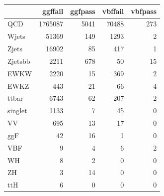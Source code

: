 \begin{tabular}{lrrrr}
\toprule
 & ggffail & ggfpass & vbffail & vbfpass \\
\midrule
QCD & 1765087 & 5041 & 70488 & 273 \\
Wjets & 51369 & 149 & 1293 & 2 \\
Zjets & 16902 & 85 & 417 & 1 \\
Zjetsbb & 2211 & 678 & 50 & 15 \\
EWKW & 2220 & 15 & 369 & 2 \\
EWKZ & 443 & 21 & 66 & 4 \\
ttbar & 6743 & 62 & 207 & 2 \\
singlet & 1133 & 7 & 45 & 0 \\
VV & 695 & 13 & 17 & 0 \\
ggF & 42 & 16 & 1 & 0 \\
VBF & 9 & 4 & 6 & 2 \\
WH & 8 & 2 & 0 & 0 \\
ZH & 3 & 14 & 0 & 0 \\
ttH & 6 & 0 & 0 & 0 \\
\bottomrule
\end{tabular}
